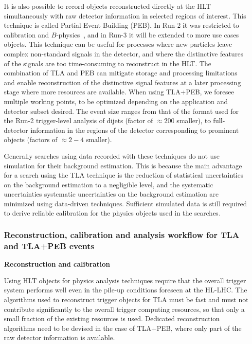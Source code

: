 It is also possible to record objects reconstructed directly at the HLT simultaneously with raw detector information in selected regions of interest. This technique is called Partial Event Building (PEB). 
In Run-2 it was restricted to calibration and $B$-physics~\cite{TRIG-2016-01}, and in Run-3 it will be extended to more use cases objects. 
This technique can be useful for processes where new particles leave complex non-standard signals in the detector, and where the distinctive features of the signals are too time-consuming to reconstruct in the HLT. The combination of TLA and PEB can mitigate storage and processing limitations and enable reconstruction of the distinctive signal features at a later processing stage where more resources are available. 
When using TLA+PEB, we foresee multiple working points, to be optimized depending on the application and detector subset desired. The event size ranges from that of the format used for the Run-2 trigger-level analysis of dijets (factor of $\approx200$ smaller), to full-detector information in the regions of the detector corresponding to prominent objects (factors of $\approx 2-4$ smaller). %

Generally searches using data recorded with these techniques do not use simulation for their background estimation. This is because the main advantage for a search using the TLA technique is the reduction of statistical uncertainties on the background estimation to a negligible level, and the systematic uncertainties systematic uncertainties on the background estimation are minimized using data-driven techniques. Sufficient simulated data is still required to derive reliable calibration for the physics objects used in the searches. 

\subsubsection{Reconstruction, calibration and analysis workflow for TLA and TLA+PEB events}

\textbf{Reconstruction and calibration} 


Using HLT objects for physics analysis techniques require that the overall trigger system performs well even in the pile-up conditions foreseen at the HL-LHC. 
The algorithms used to reconstruct trigger objects for TLA must be fast and must not contribute significantly to the overall trigger computing resources, so that only a small fraction of the existing resources is used. 
Dedicated reconstruction algorithms need to be devised in the case of TLA+PEB, where only part of the raw detector information is available. 

